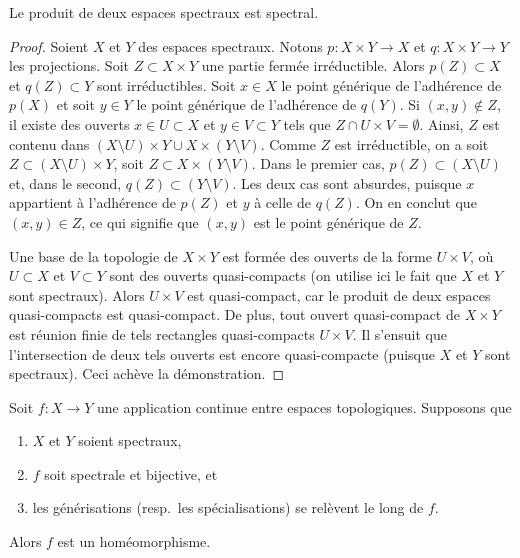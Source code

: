 \begin{lemma}
\label{lemma-product-spectral-spaces}
Le produit de deux espaces spectraux est spectral.
\end{lemma}

\begin{proof}
Soient $X$ et $Y$ des espaces spectraux. Notons $p : X \times Y \to X$ et
$q : X \times Y \to Y$ les projections. Soit $Z \subset X \times Y$ une
partie fermée irréductible. Alors $p(Z) \subset X$ et $q(Z) \subset Y$ sont
irréductibles. Soit $x \in X$ le point générique de l'adhérence de $p(X)$ et
soit $y \in Y$ le point générique de l'adhérence de $q(Y)$. Si
$(x, y) \not \in Z$, il existe des ouverts $x \in U \subset X$ et
$y \in V \subset Y$ tels que $Z \cap U \times V = \emptyset$. Ainsi, $Z$
est contenu dans
$(X \setminus U) \times Y \cup X \times (Y \setminus V)$.
Comme $Z$ est irréductible, on a soit
$Z \subset (X \setminus U) \times Y$, soit
$Z \subset X \times (Y \setminus V)$.
Dans le premier cas, $p(Z) \subset (X \setminus U)$ et, dans le second,
$q(Z) \subset (Y \setminus V)$. Les deux cas sont absurdes, puisque $x$
appartient à l'adhérence de $p(Z)$ et $y$ à celle de $q(Z)$. On en conclut que
$(x, y) \in Z$, ce qui signifie que $(x, y)$ est le point générique de $Z$.

\medskip\noindent
Une base de la topologie de $X \times Y$ est formée des ouverts de la forme
$U \times V$, où $U \subset X$ et $V \subset Y$ sont des ouverts
quasi-compacts (on utilise ici le fait que $X$ et $Y$ sont spectraux).
Alors $U \times V$ est quasi-compact, car le produit de deux espaces
quasi-compacts est quasi-compact. De plus, tout ouvert quasi-compact de
$X \times Y$ est réunion finie de tels rectangles quasi-compacts $U \times V$.
Il s'ensuit que l'intersection de deux tels ouverts est encore quasi-compacte
(puisque $X$ et $Y$ sont spectraux). Ceci achève la démonstration.
\end{proof}

\begin{lemma}
\label{lemma-spectral-bijective}
Soit $f : X \to Y$ une application continue entre espaces topologiques.
Supposons que
\begin{enumerate}
\item $X$ et $Y$ soient spectraux,
\item $f$ soit spectrale et bijective, et
\item les générisations (resp.\ les spécialisations) se relèvent le long de
$f$.
\end{enumerate}
Alors $f$ est un homéomorphisme.
\end{lemma}

